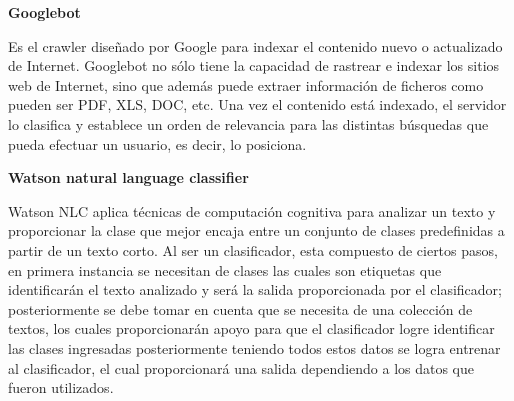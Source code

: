 \begin{large}
	 \textbf{Googlebot}\\
\end{large}

Es el crawler diseñado por Google para indexar el contenido nuevo o actualizado de Internet.
Googlebot \citep{CD13} no sólo tiene la capacidad de rastrear e indexar los sitios web de Internet, sino que además puede extraer información de ficheros como pueden ser PDF, XLS, DOC, etc.
Una vez el contenido está indexado, el servidor lo clasifica y establece un orden de relevancia para las distintas búsquedas que pueda efectuar un usuario, es decir, lo posiciona.\\



\begin{large}
	 \textbf{Watson natural language classifier}\\
\end{large}

Watson NLC \citep{CD14} aplica técnicas de computación cognitiva para analizar un texto y proporcionar la clase que mejor encaja entre un conjunto de clases predefinidas a partir de un texto corto.
Al ser un clasificador, esta compuesto de ciertos pasos, en primera instancia se necesitan de clases las cuales son etiquetas que identificarán el texto analizado y será la salida proporcionada por el clasificador; posteriormente se debe tomar en cuenta que se necesita de una colección de textos, los cuales proporcionarán apoyo para que el clasificador logre identificar las clases ingresadas posteriormente teniendo todos estos datos se logra entrenar al clasificador, el cual proporcionará una salida dependiendo a los datos que fueron utilizados.


